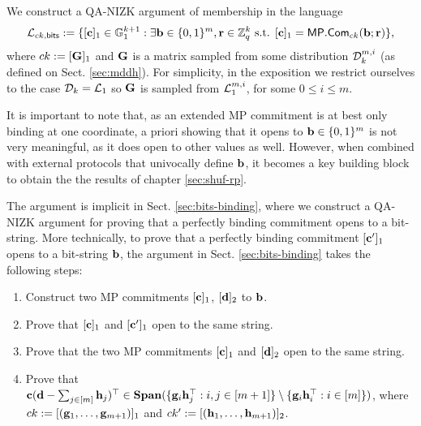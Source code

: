 We construct a QA-NIZK argument of membership in the language
$$
\mathcal{L}_{ck,\mathsf{bits}} := \{[\mathbf{c}]_1\in\mathbb{G}_1^{k+1} : \exists \mathbf{b}\in\{0,1\}^m,\mathbf{r}\in\mathbb{Z}_q^k \text{ s.t. } [\mathbf{c}]_1 = \mathsf{MP}.\mathsf{Com}_{ck}(\mathbf{b};\mathbf{r})\},
$$
where $ck:=[\mathbf{{G}}]_1$ and $\mathbf{{G}}$ is a matrix sampled from 
some distribution $\mathcal{D}_k^{m,i}$ (as defined on Sect. \ref{sec:mddh}). For simplicity, in the exposition we restrict ourselves to the case $\mathcal{D}_k=\mathcal{L}_{1}$ so  $\mathbf{{G}}$ is sampled from $\mathcal{L}_1^{m,i}$, for some $0 \leq i \leq m$.

It is important to note that, as an extended MP commitment is at best only binding at one coordinate, a priori showing that it opens to $\mathbf{b} \in \{0,1\}^m$ is not very meaningful, as it does open to other values as well. However, when combined with external protocols that univocally define $\mathbf{b}$, it becomes a key building block to obtain the the results of chapter \ref{sec:shuf-rp}.

The argument is implicit in Sect. \ref{sec:bits-binding}, where we construct a QA-NIZK argument for proving that a perfectly binding commitment opens to a bit-string. More technically, to prove that a  perfectly binding commitment $[\mathbf{c}']_1$ opens to a bit-string $\mathbf{b}$, the argument in Sect. \ref{sec:bits-binding} takes the following steps:
\begin{enumerate}
\item Construct two MP commitments $[\mathbf{c}]_1$, 
$[\mathbf{d}]_2$ to $\mathbf{b}$. 
\item Prove that $[\mathbf{c}]_1$ and $[\mathbf{c}']_1$ open to the same string. 
\item Prove that the two MP commitments $[\mathbf{c}]_1$ and $[\mathbf{d}]_2$ open to the same string.
\item Prove that $\mathbf{c}(\mathbf{d}-\sum_{j \in [m]}
\mathbf{h}_j)^\top\in\mathbf{Span}(\{\mathbf{g}_i\mathbf{h}_j^\top:i,j\in[m+1]\}\setminus\{\mathbf{g}_i\mathbf{h}_i^\top:i\in[m]\})$, where $ck:=[(\mathbf{g}_1,\ldots,\mathbf{g}_{m+1})]_1$ and $ck':=[(\mathbf{h}_1,\ldots,\mathbf{h}_{m+1})]_2$.
\end{enumerate}


